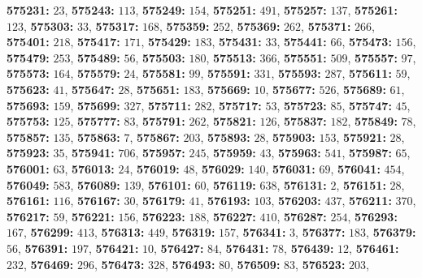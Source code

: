 \textsf{\bfseries 575231:} $23$, \textsf{\bfseries 575243:} $113$, \textsf{\bfseries 575249:} $154$, \textsf{\bfseries 575251:} $491$, \textsf{\bfseries 575257:} $137$, \textsf{\bfseries 575261:} $123$, \textsf{\bfseries 575303:} $33$, \textsf{\bfseries 575317:} $168$, \textsf{\bfseries 575359:} $252$, \textsf{\bfseries 575369:} $262$, \textsf{\bfseries 575371:} $266$, \textsf{\bfseries 575401:} $218$, \textsf{\bfseries 575417:} $171$, \textsf{\bfseries 575429:} $183$, \textsf{\bfseries 575431:} $33$, \textsf{\bfseries 575441:} $66$, \textsf{\bfseries 575473:} $156$, \textsf{\bfseries 575479:} $253$, \textsf{\bfseries 575489:} $56$, \textsf{\bfseries 575503:} $180$, \textsf{\bfseries 575513:} $366$, \textsf{\bfseries 575551:} $509$, \textsf{\bfseries 575557:} $97$, \textsf{\bfseries 575573:} $164$, \textsf{\bfseries 575579:} $24$, \textsf{\bfseries 575581:} $99$, \textsf{\bfseries 575591:} $331$, \textsf{\bfseries 575593:} $287$, \textsf{\bfseries 575611:} $59$, \textsf{\bfseries 575623:} $41$, \textsf{\bfseries 575647:} $28$, \textsf{\bfseries 575651:} $183$, \textsf{\bfseries 575669:} $10$, \textsf{\bfseries 575677:} $526$, \textsf{\bfseries 575689:} $61$, \textsf{\bfseries 575693:} $159$, \textsf{\bfseries 575699:} $327$, \textsf{\bfseries 575711:} $282$, \textsf{\bfseries 575717:} $53$, \textsf{\bfseries 575723:} $85$, \textsf{\bfseries 575747:} $45$, \textsf{\bfseries 575753:} $125$, \textsf{\bfseries 575777:} $83$, \textsf{\bfseries 575791:} $262$, \textsf{\bfseries 575821:} $126$, \textsf{\bfseries 575837:} $182$, \textsf{\bfseries 575849:} $78$, \textsf{\bfseries 575857:} $135$, \textsf{\bfseries 575863:} $7$, \textsf{\bfseries 575867:} $203$, \textsf{\bfseries 575893:} $28$, \textsf{\bfseries 575903:} $153$, \textsf{\bfseries 575921:} $28$, \textsf{\bfseries 575923:} $35$, \textsf{\bfseries 575941:} $706$, \textsf{\bfseries 575957:} $245$, \textsf{\bfseries 575959:} $43$, \textsf{\bfseries 575963:} $541$, \textsf{\bfseries 575987:} $65$, \textsf{\bfseries 576001:} $63$, \textsf{\bfseries 576013:} $24$, \textsf{\bfseries 576019:} $48$, \textsf{\bfseries 576029:} $140$, \textsf{\bfseries 576031:} $69$, \textsf{\bfseries 576041:} $454$, \textsf{\bfseries 576049:} $583$, \textsf{\bfseries 576089:} $139$, \textsf{\bfseries 576101:} $60$, \textsf{\bfseries 576119:} $638$, \textsf{\bfseries 576131:} $2$, \textsf{\bfseries 576151:} $28$, \textsf{\bfseries 576161:} $116$, \textsf{\bfseries 576167:} $30$, \textsf{\bfseries 576179:} $41$, \textsf{\bfseries 576193:} $103$, \textsf{\bfseries 576203:} $437$, \textsf{\bfseries 576211:} $370$, \textsf{\bfseries 576217:} $59$, \textsf{\bfseries 576221:} $156$, \textsf{\bfseries 576223:} $188$, \textsf{\bfseries 576227:} $410$, \textsf{\bfseries 576287:} $254$, \textsf{\bfseries 576293:} $167$, \textsf{\bfseries 576299:} $413$, \textsf{\bfseries 576313:} $449$, \textsf{\bfseries 576319:} $157$, \textsf{\bfseries 576341:} $3$, \textsf{\bfseries 576377:} $183$, \textsf{\bfseries 576379:} $56$, \textsf{\bfseries 576391:} $197$, \textsf{\bfseries 576421:} $10$, \textsf{\bfseries 576427:} $84$, \textsf{\bfseries 576431:} $78$, \textsf{\bfseries 576439:} $12$, \textsf{\bfseries 576461:} $232$, \textsf{\bfseries 576469:} $296$, \textsf{\bfseries 576473:} $328$, \textsf{\bfseries 576493:} $80$, \textsf{\bfseries 576509:} $83$, \textsf{\bfseries 576523:} $203$, 
